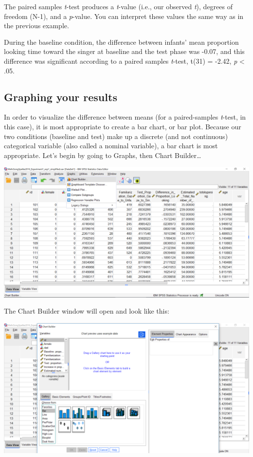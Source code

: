 \documentclass[
]{book}
\begin{document}
The paired samples \emph{t}-test produces a \emph{t}-value (i.e., our observed \emph{t}), degrees of freedom (N-1), and a \emph{p}-value. You can interpret these values the same way as in the previous example.

During the baseline condition, the difference between infants' mean proportion looking time toward the singer at baseline and the test phase was -0.07, and this difference was significant according to a paired samples \emph{t}-test, t(31) = -2.42, \emph{p} \textless{} .05.

\hypertarget{graphing-your-results}{%
\subsection{Graphing your results}\label{graphing-your-results}}

In order to visualize the difference between means (for a paired-samples \emph{t}-test, in this case), it is most appropriate to create a bar chart, or bar plot. Because our two conditions (baseline and test) make up a discrete (and not continuous) categorical variable (also called a nominal variable), a bar chart is most appropriate. Let's begin by going to {Graphs}, then {Chart Builder\ldots{}}

\includegraphics{img/6.4.20.png}

The Chart Builder window will open and look like this:

\includegraphics{img/6.4.21.png}
\end{document}
